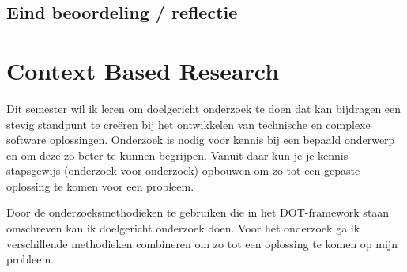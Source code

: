 \bigskip
\subsection{Eind beoordeling / reflectie}
%












\newpage
\section{Context Based Research}\label{sec:context-based-research}


Dit semester wil ik leren om doelgericht onderzoek te doen dat kan bijdragen een stevig
standpunt te creëren bij het ontwikkelen van technische en complexe software oplossingen.
Onderzoek is nodig voor kennis bij een bepaald onderwerp en om deze zo beter te kunnen begrijpen.
Vanuit daar kun je je kennis stapsgewijs (onderzoek voor onderzoek) opbouwen om zo tot een gepaste oplossing te
komen voor een probleem.


Door de onderzoeksmethodieken te gebruiken die in het DOT-framework staan omschreven kan ik doelgericht onderzoek
doen.
Voor het onderzoek ga ik verschillende methodieken combineren om zo tot een oplossing te komen op mijn probleem.


